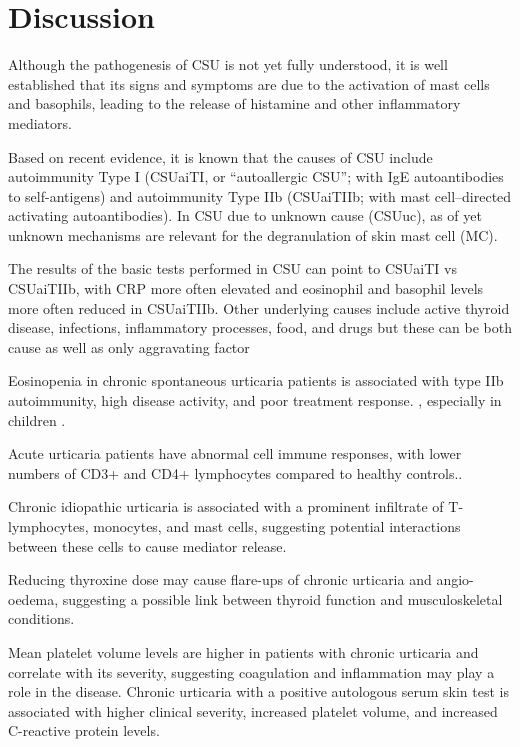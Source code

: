 \documentclass[final,1p,times,authoryear]{elsarticle}
\begin{document}
\section{Discussion}\label{Discussion}



Although the pathogenesis of CSU is not yet fully understood, it is well established that its signs and symptoms are due to the activation of mast cells and basophils, leading to the release of histamine and other inflammatory mediators\citep{Zuberbier2021The}. 

Based on recent evidence, it is known that the causes of CSU include autoimmunity Type I (CSUaiTI, or “autoallergic CSU”; with IgE autoantibodies to self-antigens) and autoimmunity Type IIb (CSUaiTIIb; with mast cell–directed activating autoantibodies). In CSU due to unknown cause (CSUuc), as of yet unknown mechanisms are relevant for the degranulation of skin mast cell (MC)\citep{sella2023type, Maronese2023IgG}.

The results of the basic tests performed in CSU can point to CSUaiTI vs CSUaiTIIb, with CRP more often elevated and eosinophil and basophil levels more often reduced in CSUaiTIIb\citep{Xiang2023Chronic}.
Other underlying causes include active thyroid disease, infections, inflammatory processes, food, and drugs but these can be both cause as well as only aggravating factor\citep{Kolkhir2021Autoimmune}


Eosinopenia in chronic spontaneous urticaria patients is associated with type IIb autoimmunity, high disease activity, and poor treatment response. \citep{Kolkhir2019Eosinopenia}, especially in children \citep{A2023Serum}.

Acute urticaria patients have abnormal cell immune responses, with lower numbers of CD3+ and CD4+ lymphocytes compared to healthy controls.\citep{De-yu2009Determination}.

Chronic idiopathic urticaria is associated with a prominent infiltrate of T-lymphocytes, monocytes, and mast cells, suggesting potential interactions between these cells to cause mediator release.\citep{Elias1986Studies}

Reducing thyroxine dose may cause flare-ups of chronic urticaria and angio-oedema, suggesting a possible link between thyroid function and musculoskeletal conditions.\citep{Dunkley2003Thyroid}

Mean platelet volume levels are higher in patients with chronic urticaria and correlate with its severity, suggesting coagulation and inflammation may play a role in the disease.\citep{Aleem2015Correlation} Chronic urticaria with a positive autologous serum skin test is associated with higher clinical severity, increased platelet volume, and increased C-reactive protein levels.\citep{Magen2010Increased} 
\end{document}
